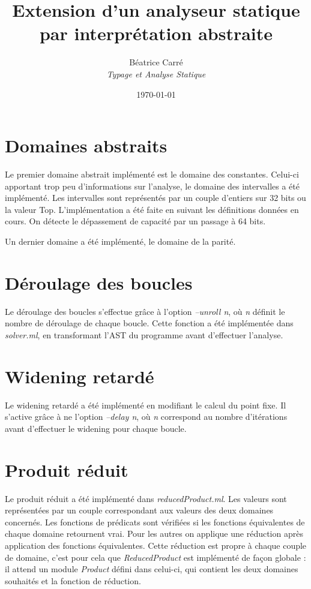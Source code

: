 \documentclass[a4paper, 11pt]{article}
\title{\vfill
  \huge Extension d’un analyseur statique par
interprétation abstraite
\\
}
\author{
  Béatrice Carré \\
  \emph{Typage et Analyse Statique}
}
\date{\today\vfill}
\begin{document}
\maketitle


\section{Domaines abstraits}
Le premier domaine abstrait implémenté est le domaine des constantes. Celui-ci apportant trop peu d'informations sur l'analyse, le domaine des intervalles a été implémenté.
Les intervalles sont représentés par un couple d'entiers sur 32 bits ou la valeur Top. L'implémentation a été faite en suivant les définitions données en cours. On détecte le dépassement de capacité par un passage à 64 bits.

Un dernier domaine a été implémenté, le domaine de la parité. 


\section{Déroulage des boucles}
Le déroulage des boucles s'effectue grâce à l'option \emph{--unroll n}, où \emph{n} définit le nombre de déroulage de chaque boucle. Cette fonction a été implémentée dans \emph{solver.ml}, en transformant l'AST du programme avant d'effectuer l'analyse.

\section{Widening retardé}
Le widening retardé a été implémenté en modifiant le calcul du point fixe. Il s'active grâce à ne l'option \emph{--delay n}, où \emph{n} correspond au nombre d'itérations avant d'effectuer le widening pour chaque boucle.

\section{Produit réduit}
Le produit réduit a été implémenté dans \emph{reducedProduct.ml}. Les valeurs sont représentées par un couple correspondant aux valeurs des deux domaines concernés. Les fonctions de prédicats sont vérifiées si les fonctions équivalentes de chaque domaine retournent vrai.
 Pour les autres on applique une réduction après application des fonctions équivalentes. Cette réduction est propre à chaque couple de domaine, c'est pour cela que \emph{ReducedProduct} est implémenté de façon globale : il attend un module \emph{Product} défini dans celui-ci, qui contient les deux domaines souhaités et la fonction de réduction.
\end{document}
